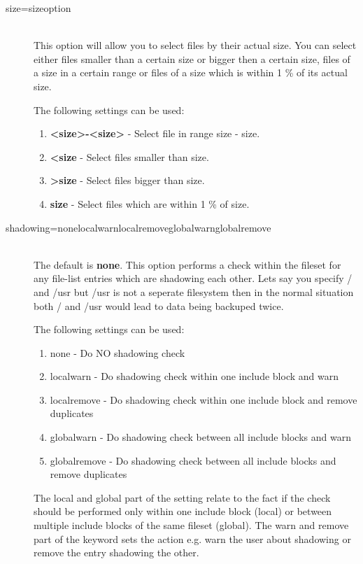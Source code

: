 \begin{description}
\item [size=sizeoption] \hfill \\
   This option will allow you to select files by their actual size.
   You can select either files smaller than a certain size or bigger
   then a certain size, files of a size in a certain range or files
   of a size which is within 1 \% of its actual size.

   The following settings can be used:

   \begin{enumerate}
   \item {\bf {\textless}size{\textgreater}-{\textless}size{\textgreater}} - Select file in range size - size.
   \item {\bf {\textless}size} - Select files smaller than size.
   \item {\bf {\textgreater}size} - Select files bigger than size.
   \item {\bf size} - Select files which are within 1 \% of size.
   \end{enumerate}

\item [shadowing=none{\textbar}localwarn{\textbar}localremove{\textbar}globalwarn{\textbar}globalremove] \hfill \\
   The default is {\bf none}. This option performs a check within the
   fileset for any file-list entries which are shadowing each other.
   Lets say you specify / and /usr but /usr is not a seperate filesystem
   then in the normal situation both / and /usr would lead to data being
   backuped twice.

   The following settings can be used:

   \begin{enumerate}
   \item none - Do NO shadowing check
   \item localwarn - Do shadowing check within one include block and warn
   \item localremove - Do shadowing check within one include block and remove duplicates
   \item globalwarn - Do shadowing check between all include blocks and warn
   \item globalremove - Do shadowing check between all include blocks and remove duplicates
   \end{enumerate}

   The local and global part of the setting relate to the fact if the check
   should be performed only within one include block (local) or between multiple
   include blocks of the same fileset (global). The warn and remove part of the
   keyword sets the action e.g. warn the user about shadowing or remove
   the entry shadowing the other.


\end{description}
